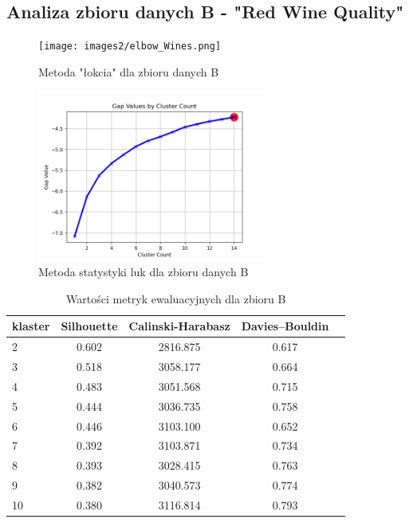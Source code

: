 \documentclass[a4paper,11pt]{article}
\begin{document}
\subsection{Analiza zbioru danych B - "Red Wine Quality"}
\begin{figure}[H]
    	\centering
    	\texttt{[image: images2/elbow\_Wines.png]}
    	\caption{Metoda "łokcia" dla zbioru danych B}
    	\label{silh_bk}
\end{figure}
\begin{figure}[H]
    	\centering
    	\includegraphics[width=0.67\textwidth]{images3/GAP2.png}
    	\caption{Metoda statystyki luk dla zbioru danych B}
    	\label{silh_bg}
\end{figure}
\begin{table}[H]
\centering
\caption{Wartości metryk ewaluacyjnych dla zbioru B}
\label{tab:silh_b}
\begin{tabular}{|l|c|c|c|c|}
\hline
\multicolumn{1}{|c|}{\textbf{klaster}} & \textbf{Silhouette} & \textbf{Calinski-Harabasz} & \textbf{Davies–Bouldin}  \\ \hline
2  & 0.602 & 2816.875 & 0.617  \\ \hline
3 & 0.518 & 3058.177 & 0.664  \\ \hline
4 & 0.483 & 3051.568 & 0.715  \\ \hline
5 & 0.444 & 3036.735 & 0.758  \\ \hline
6 & 0.446 & 3103.100 & 0.652  \\ \hline
7 & 0.392 & 3103.871 & 0.734  \\ \hline
8 & 0.393 & 3028.415 & 0.763  \\ \hline
9 & 0.382 & 3040.573 & 0.774  \\ \hline
10 & 0.380 & 3116.814 & 0.793  \\ \hline
\end{tabular}
\end{table}
\end{document}
